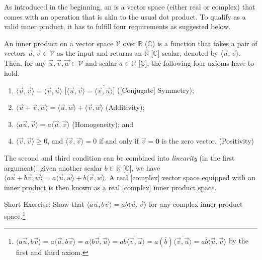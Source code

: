 As introduced in the beginning, an  is a vector space (either real or complex) that comes with an  operation that is akin to the usual dot product. To qualify as a valid inner product, it has to fulfill four requirements as suggested below.
\begin{defn}
\label{defn:innerprod}
An inner product on a vector space $\mathcal{V}$ over $\mathbb{R}$ ($\mathbb{C}$) is a function that takes a pair of vectors $\vec{u}, \vec{v} \in \mathcal{V}$ as the input and returns an $\mathbb{R}$ [$\mathbb{C}$] scalar, denoted by $\langle \vec{u}, \vec{v} \rangle$. Then, for any $\vec{u}, \vec{v}, \vec{w} \in \mathcal{V}$ and scalar $a \in \mathbb{R}$ [$\mathbb{C}$], the following four axioms have to hold.
\begin{enumerate}
    \item $\langle \vec{u}, \vec{v} \rangle = \langle \vec{v}, \vec{u} \rangle$ [$\langle \vec{u}, \vec{v} \rangle = \overline{\langle \vec{v}, \vec{u} \rangle}$] ([Conjugate] Symmetry);
    \item $\langle \vec{u}+\vec{v}, \vec{w} \rangle = \langle \vec{u}, \vec{w} \rangle + \langle \vec{v}, \vec{w} \rangle$ (Additivity);
    \item $\langle a\vec{u}, \vec{v} \rangle = a\langle \vec{u}, \vec{v} \rangle$ (Homogeneity); and
    \item $\langle \vec{v}, \vec{v} \rangle \geq 0$, and $\langle \vec{v}, \vec{v} \rangle = 0$ if and only if $\vec{v} = \textbf{0}$ is the zero vector. (Positivity)
\end{enumerate}
The second and third condition can be combined into \textit{linearity} (in the first argument): given another scalar $b \in \mathbb{R}$ [$\mathbb{C}$], we have $\langle a\vec{u}+b\vec{v}, \vec{w} \rangle = a\langle \vec{u}, \vec{w} \rangle + b\langle \vec{v}, \vec{w} \rangle$. A real [complex] vector space equipped with an inner product is then known as a real [complex] inner product space. 
\end{defn}
Short Exercise: Show that $\langle a\vec{u}, b\vec{v} \rangle = a\overline{b}\langle \vec{u}, \vec{v} \rangle$ for any complex inner product space.\footnote{$\langle a\vec{u}, b\vec{v} \rangle = a\langle \vec{u}, b\vec{v} \rangle = a\overline{\langle b\vec{v}, \vec{u} \rangle} = a\overline{b\langle \vec{v}, \vec{u} \rangle} = a(\overline{b}) \overline{\langle \vec{v}, \vec{u} \rangle} = a\overline{b}\langle \vec{u}, \vec{v} \rangle$ by the first and third axiom.}\par
